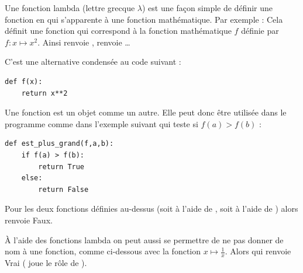 \documentclass[11pt,class=report,crop=false]{standalone}
\begin{document}
\begin{cours}
	
	
Une fonction lambda (lettre grecque $\lambda$) est une façon simple de définir une fonction en \Python{} qui s'apparente à une fonction mathématique. Par
exemple :
Cela définit une fonction \Python{}  qui correspond à la fonction mathématique $f$ définie par $f : x \mapsto x^2$.
Ainsi  renvoie ,  renvoie \ldots

C'est une alternative condensée au code suivant :
\begin{center}
\begin{minipage}{0.6\textwidth}
\begin{lstlisting}
def f(x):
    return x**2
\end{lstlisting} 
\end{minipage}
\end{center}

\bigskip

Une fonction est un objet \Python{} comme un autre. Elle peut donc être utilisée dans le programme comme dans l'exemple suivant qui teste si $f(a)>f(b)$ :

\begin{center}
\begin{minipage}{0.6\textwidth}
\begin{lstlisting}
def est_plus_grand(f,a,b):
    if f(a) > f(b):
        return True
    else:
        return False  
\end{lstlisting} 
\end{minipage}
\end{center}


Pour les deux fonctions  définies au-dessus (soit à l'aide de , soit à l'aide de ) alors
renvoie \og{}Faux\fg{}.

\`A l'aide des fonctions lambda on peut aussi se permettre de ne pas donner de nom à une fonction, comme ci-dessous avec la fonction $x \mapsto \frac1x$. Alors
qui renvoie \og{}Vrai\fg{} ( joue le rôle de ).
\end{cours}



\end{document}

